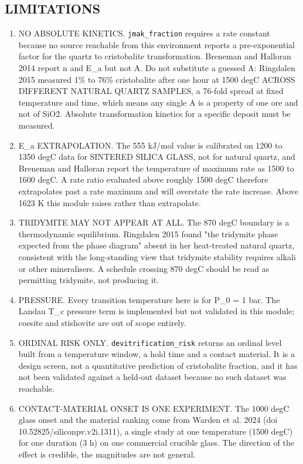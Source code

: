 \documentclass[10pt,a4paper,twoside]{report}
\begin{document}
\subsection*{LIMITATIONS}

\begin{enumerate}[leftmargin=*,label=\arabic*.]
\item NO ABSOLUTE KINETICS. \texttt{jmak\_fraction} requires a rate constant because no source reachable from this environment reports a pre-exponential factor for the quartz to cristobalite transformation. Breneman and Halloran 2014 report n and E\_a but not A. Do not substitute a guessed A: Ringdalen 2015 measured 1\% to 76\% cristobalite after one hour at 1500 degC ACROSS DIFFERENT NATURAL QUARTZ SAMPLES, a 76-fold spread at fixed temperature and time, which means any single A is a property of one ore and not of SiO2. Absolute transformation kinetics for a specific deposit must be measured.
\item E\_a EXTRAPOLATION. The 555 kJ/mol value is calibrated on 1200 to 1350 degC data for SINTERED SILICA GLASS, not for natural quartz, and Breneman and Halloran report the temperature of maximum rate as 1500 to 1600 degC. A rate ratio evaluated above roughly 1500 degC therefore extrapolates past a rate maximum and will overstate the rate increase. Above 1623 K this module raises rather than extrapolate.
\item TRIDYMITE MAY NOT APPEAR AT ALL. The 870 degC boundary is a thermodynamic equilibrium. Ringdalen 2015 found "the tridymite phase expected from the phase diagram" absent in her heat-treated natural quartz, consistent with the long-standing view that tridymite stability requires alkali or other mineralisers. A schedule crossing 870 degC should be read as permitting tridymite, not producing it.
\item PRESSURE. Every transition temperature here is for P\_0 = 1 bar. The Landau T\_c pressure term is implemented but not validated in this module; coesite and stishovite are out of scope entirely.
\item ORDINAL RISK ONLY. \texttt{devitrification\_risk} returns an ordinal level built from a temperature window, a hold time and a contact material. It is a design screen, not a quantitative prediction of cristobalite fraction, and it has not been validated against a held-out dataset because no such dataset was reachable.
\item CONTACT-MATERIAL ONSET IS ONE EXPERIMENT. The 1000 degC glass onset and the material ranking come from Warden et al. 2024 (doi 10.52825/siliconpv.v2i.1311), a single study at one temperature (1500 degC) for one duration (3 h) on one commercial crucible glass. The direction of the effect is credible, the magnitudes are not general.
\end{enumerate}
\end{document}
